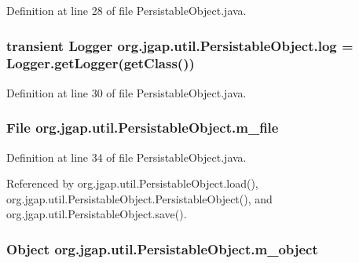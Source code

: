 Definition at line 28 of file Persistable\-Object.\-java.

\hypertarget{classorg_1_1jgap_1_1util_1_1_persistable_object_a0ac7a597870afd446b102f84c7564408}{
\subsubsection[{log}]{\setlength{\rightskip}{0pt plus 5cm}transient Logger org.\-jgap.\-util.\-Persistable\-Object.\-log = Logger.\-get\-Logger(get\-Class())\hspace{0.3cm}{\ttfamily [private]}}}\label{classorg_1_1jgap_1_1util_1_1_persistable_object_a0ac7a597870afd446b102f84c7564408}


Definition at line 30 of file Persistable\-Object.\-java.

\hypertarget{classorg_1_1jgap_1_1util_1_1_persistable_object_a92029c1701d5e33a133b99a4c49f1c2d}{
\subsubsection[{m\-\_\-file}]{\setlength{\rightskip}{0pt plus 5cm}File org.\-jgap.\-util.\-Persistable\-Object.\-m\-\_\-file\hspace{0.3cm}{\ttfamily [private]}}}\label{classorg_1_1jgap_1_1util_1_1_persistable_object_a92029c1701d5e33a133b99a4c49f1c2d}


Definition at line 34 of file Persistable\-Object.\-java.



Referenced by org.\-jgap.\-util.\-Persistable\-Object.\-load(), org.\-jgap.\-util.\-Persistable\-Object.\-Persistable\-Object(), and org.\-jgap.\-util.\-Persistable\-Object.\-save().

\hypertarget{classorg_1_1jgap_1_1util_1_1_persistable_object_a148fd38406ea69f0d91f4a6c0edc5d19}{
\subsubsection[{m\-\_\-object}]{\setlength{\rightskip}{0pt plus 5cm}Object org.\-jgap.\-util.\-Persistable\-Object.\-m\-\_\-object\hspace{0.3cm}{\ttfamily [private]}}}\label{classorg_1_1jgap_1_1util_1_1_persistable_object_a148fd38406ea69f0d91f4a6c0edc5d19}



